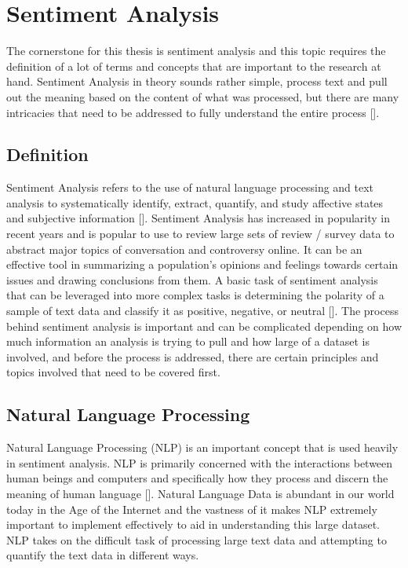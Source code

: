 \section{Sentiment Analysis}
The cornerstone for this thesis is sentiment analysis and this topic requires the definition of a lot of terms and concepts that are important to the research at hand.
Sentiment Analysis in theory sounds rather simple, process text and pull out the meaning based on the content of what was processed, but there are many intricacies that need to be addressed to fully understand the entire process [\cite{liu2012sentiment}].

\subsection{Definition}
Sentiment Analysis refers to the use of natural language processing and text analysis to systematically identify, extract, quantify, and study affective states and subjective information [\cite{liu2012sentiment}].
Sentiment Analysis has increased in popularity in recent years and is popular to use to review large sets of review / survey data to abstract major topics of conversation and controversy online.
It can be an effective tool in summarizing a population's opinions and feelings towards certain issues and drawing conclusions from them.
A basic task of sentiment analysis that can be leveraged into more complex tasks is determining the polarity of a sample of text data and classify it as positive, negative, or neutral [\cite{wilson2005recognizing}].
The process behind sentiment analysis is important and can be complicated depending on how much information an analysis is trying to pull and how large of a dataset is involved, and before the process is addressed, there are certain principles and topics involved that need to be covered first.

\subsection{Natural Language Processing}
Natural Language Processing (NLP) is an important concept that is used heavily in sentiment analysis.
NLP is primarily concerned with the interactions between human beings and computers and specifically how they process and discern the meaning of human language [\cite{liddy2001natural}].
Natural Language Data is abundant in our world today in the Age of the Internet and the vastness of it makes NLP extremely important to implement effectively to aid in understanding this large dataset.
NLP takes on the difficult task of processing large text data and attempting to quantify the text data in different ways.

